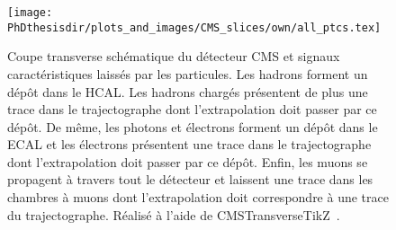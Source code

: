 \begin{figure}[t]
\texttt{[image: \\PhDthesisdir/plots\_and\_images/CMS\_slices/own/all\_ptcs.tex]}
\caption[Coupe transverse schématique du détecteur CMS.]{Coupe transverse schématique du détecteur CMS et signaux caractéristiques laissés par les particules. Les hadrons forment un dépôt dans le HCAL. Les hadrons chargés présentent de plus une trace dans le trajectographe dont l'extrapolation doit passer par ce dépôt. De même, les photons et électrons forment un dépôt dans le ECAL et les électrons présentent une trace dans le trajectographe dont l'extrapolation doit passer par ce dépôt. Enfin, les muons se propagent à travers tout le détecteur et laissent une trace dans les chambres à muons dont l'extrapolation doit correspondre à une trace du trajectographe. Réalisé à l'aide de CMSTransverseTikZ~\cite{CMSTransverseTikZ}.}
\label{fig-chapter-LHC-section-evt_reco-cms_slice}
\end{figure}

